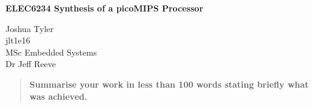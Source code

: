 


	
	
	\centering
	{\Large\bfseries ELEC6234  Synthesis of a picoMIPS Processor \par}
	\vspace{1cm}
	{ Joshua Tyler\\
		jlt1e16\\
		MSc Embedded Systems\\
		Dr Jeff Reeve
		\par}
	\vspace{1cm}
	
\begin{abstract}
	{
		\color{red} \bfseries
		Summarise your work in less than 100 words stating briefly what was achieved.
	}
\end{abstract}



\clearpage







          
